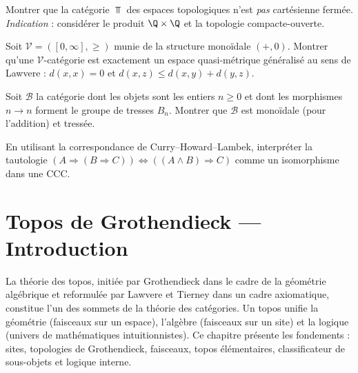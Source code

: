 \begin{exercice}\label{exo:ccc-pas-Set}
Montrer que la catégorie $\Top$ des espaces topologiques n'est
\emph{pas} cartésienne fermée.
\textit{Indication} : considérer le produit $\Q \times \Q$ et la
topologie compacte-ouverte.
\end{exercice}

\begin{exercice}\label{exo:enrichie-metrique}
Soit $\mathcal{V} = ([0, \infty], \geq)$ munie de la structure
monoïdale $(+, 0)$.  Montrer qu'une $\mathcal{V}$-catégorie est
exactement un espace quasi-métrique généralisé au sens de Lawvere :
$d(x,x) = 0$ et $d(x,z) \leq d(x,y) + d(y,z)$.
\end{exercice}

\begin{exercice}
\label{exo:tresses}
Soit $\mathcal{B}$ la catégorie dont les objets sont les entiers
$n \geq 0$ et dont les morphismes $n \to n$ forment le groupe de
tresses $B_n$.  Montrer que $\mathcal{B}$ est monoïdale (pour
l'addition) et tressée.
\end{exercice}

\begin{exercice}\label{exo:curry-logique}
En utilisant la correspondance de Curry--Howard--Lambek, interpréter
la tautologie $(A \Rightarrow (B \Rightarrow C)) \Leftrightarrow
((A \wedge B) \Rightarrow C)$ comme un isomorphisme dans une CCC.
\end{exercice}




\chapter{Topos de Grothendieck --- Introduction}\label{ch:topos}
\minitoc

\vspace{1em}

La théorie des topos, initiée par Grothendieck dans le cadre de la
géométrie algébrique et reformulée par Lawvere et Tierney dans un cadre
axiomatique, constitue l'un des sommets de la théorie des catégories.
Un topos unifie la géométrie (faisceaux sur un espace),
l'algèbre (faisceaux sur un site) et la logique (univers de
mathématiques intuitionnistes).  Ce chapitre présente les fondements :
sites, topologies de Grothendieck, faisceaux, topos élémentaires,
classificateur de sous-objets et logique interne.

